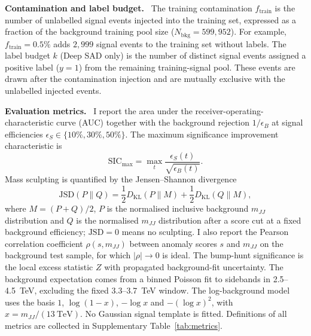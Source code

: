 \documentclass[11pt,a4paper]{article}
\newcommand{\runin}[1]{\par\vspace{2pt}\textbf{#1.}\ }
\newcommand{\ftrain}{f_{\mathrm{train}}}
\newcommand{\klabels}{k}
\newcommand{\eS}{\epsilon_S}
\newcommand{\eB}{\epsilon_B}
\newcommand{\mjj}{m_{JJ}}
\newcommand{\jsd}{\mathrm{JSD}}
\newcommand{\sic}{\mathrm{SIC}}
\begin{document}
\runin{Contamination and label budget}
The training contamination $\ftrain$ is the number of unlabelled signal
events injected into the training set, expressed as a fraction of the
background training pool size ($N_\mathrm{bkg}=599{,}952$). For example,
$\ftrain = 0.5\%$ adds $2{,}999$ signal events to the training set without
labels. The label budget $\klabels$ (Deep SAD only) is the number of distinct signal
events assigned a positive label ($y=1$) from the remaining training-signal pool. These
events are drawn after the contamination injection and are
mutually exclusive with the unlabelled injected events.

\runin{Evaluation metrics}
I report the area under the receiver-operating-characteristic curve (AUC)
together with the background rejection $1/\eB$ at signal
efficiencies $\eS \in \{10\%, 30\%, 50\%\}$. The maximum significance
improvement characteristic is
\begin{equation}
\sic_\mathrm{max} = \max_t \frac{\eS(t)}{\sqrt{\eB(t)}} .
\end{equation}
Mass sculpting is quantified by the Jensen--Shannon divergence
\begin{equation}
\jsd(P \| Q) = \frac{1}{2} D_{\mathrm{KL}}(P\|M) + \frac{1}{2} D_{\mathrm{KL}}(Q\|M),
\end{equation}
where $M = (P+Q)/2$, $P$ is the normalised inclusive background
$\mjj$ distribution and $Q$ is the normalised $\mjj$ distribution
after a score cut at a fixed background efficiency; $\jsd = 0$ means
no sculpting. I also report the Pearson correlation coefficient
$\rho(s, \mjj)$ between anomaly scores $s$ and $\mjj$ on the background
test sample, for which $|\rho| \to 0$ is ideal. The bump-hunt significance is
the local excess statistic $Z$ with propagated background-fit uncertainty.
The background expectation comes from a binned Poisson fit to sidebands
in 2.5--4.5~TeV, excluding the fixed 3.3--3.7~TeV window. The log-background
model uses the basis $1$, $\log(1-x)$, $-\log x$ and $-(\log x)^2$, with
$x=\mjj/(13~\mathrm{TeV})$. No Gaussian signal template is fitted.
Definitions of all metrics are
collected in Supplementary Table~\ref{tab:metrics}.
\end{document}
